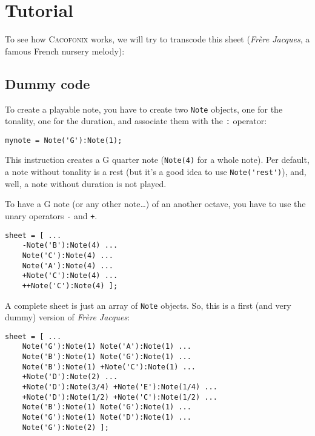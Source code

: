 \documentclass{article}
\newcommand\cacofonix{\textsc{Cacofonix}\xspace}
\newcommand\note{\lstinline!Note!\xspace}
\newcommand\frerejaques{\emph{Fr\`ere Jacques}\xspace}
\begin{document}
\section{Tutorial}

To see how \cacofonix works, we will try to transcode this sheet (\frerejaques, a famous French nursery melody):\\

\subsection{Dummy code}

To create a playable note, you have to create two \note objects, one for the tonality, one for the duration, and associate them with the \lstinline!:! operator:
\begin{lstlisting}
mynote = Note('G'):Note(1);
\end{lstlisting}
This instruction creates a G quarter note (\lstinline!Note(4)! for a whole note). Per default, a note without tonality is a rest (but it's a good idea to use \lstinline!Note('rest')!), and, well, a note without duration is not played.

To have a G note (or any other note\dots) of an another octave, you have to use the unary operators \lstinline!-! and \lstinline!+!. \\
\begin{lstlisting}
sheet = [ ...
	-Note('B'):Note(4) ...
	Note('C'):Note(4) ...
	Note('A'):Note(4) ...
	+Note('C'):Note(4) ...
	++Note('C'):Note(4) ];
\end{lstlisting}

A complete sheet is just an array of \lstinline!Note! objects. So, this is a first (and very dummy) version of \frerejaques:
\begin{lstlisting}
sheet = [ ...
	Note('G'):Note(1) Note('A'):Note(1) ...
	Note('B'):Note(1) Note('G'):Note(1) ...
	Note('B'):Note(1) +Note('C'):Note(1) ...
	+Note('D'):Note(2) ...
	+Note('D'):Note(3/4) +Note('E'):Note(1/4) ...
	+Note('D'):Note(1/2) +Note('C'):Note(1/2) ...
	Note('B'):Note(1) Note('G'):Note(1) ...
	Note('G'):Note(1) Note('D'):Note(1) ...
	Note('G'):Note(2) ];
\end{lstlisting}
\end{document}
